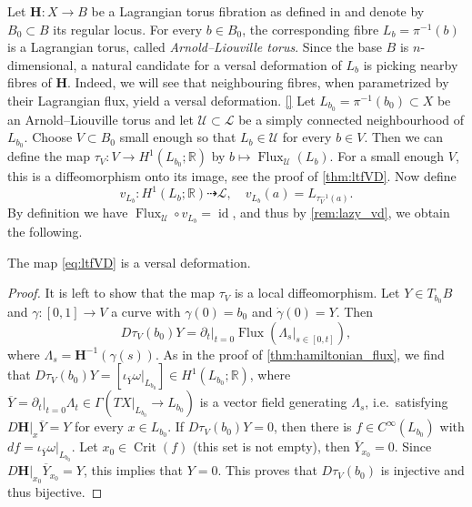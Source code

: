 \documentclass[12pt,a4paper,draft]{scrartcl}
\DeclareMathOperator{\id}{id}
\DeclareMathOperator{\Flux}{Flux}
\DeclareMathOperator{\Crit}{Crit}
\begin{document}
Let $\symbf{H} \colon X \rightarrow B$ be a Lagrangian torus fibration as defined in \cite{evans2021atfs} and denote by $B_0 \subset B$ its regular locus. For every $b \in B_0$, the corresponding fibre $L_b = \pi^{-1}(b)$ is a Lagrangian torus, called \emph{Arnold--Liouville torus}. Since the base $B$ is $n$-dimensional, a natural candidate for a versal deformation of $L_b$ is picking nearby fibres of $\symbf{H}$. Indeed, we will see that neighbouring fibres, when parametrized by their Lagrangian flux, yield a versal deformation. 
\ref{}
Let $L_{b_0} = \pi^{-1}(b_0) \subset X$ be an Arnold--Liouville torus and let $\mathcal{U} \subset \mathcal{L}$ be a simply connected neighbourhood of $L_{b_0}$. Choose $V \subset B_0$ small enough so that $L_b \in \mathcal{U}$ for every $b \in V$. Then we can define the map $τ_V \colon V \rightarrow H^1(L_{b_0};\mathbb{R})$ by $b \mapsto \Flux_{\mathcal{U}}(L_b)$. For a small enough $V$, this is a diffeomorphism onto its image, see the proof of \cref{thm:ltfVD}. Now define
\begin{equation}
    \label{eq:ltfVD}
    v_{L_b} \colon H^1(L_b;\mathbb{R}) \dashrightarrow \mathcal{L}, \quad
    v_{L_b}(a) = L_{τ_V^{-1}(a)}.
\end{equation}
By definition we have $\Flux_{\mathcal{U}} \circ v_{L_b} = \id$, and thus by \cref{rem:lazy_vd}, we obtain the following. 

\begin{proposition}
    \label{thm:ltfVD}
    The map \eqref{eq:ltfVD} is a versal deformation. 
\end{proposition}

\begin{proof}
    It is left to show that the map $τ_V$ is a local diffeomorphism.
    Let $Y \in T_{b_0}B$ and $\gamma \colon [0,1] \rightarrow V$ a curve with $\gamma(0) = b_0$ and $\dot{\gamma}(0) = Y$.
    Then 
    \[
        \label{eq:Dphi}
        Dτ_V(b_0) Y = \partial_t\vert_{t = 0} \Flux (\Lambda_s\vert_{s \in [0,t]}),
    \]
    where $\Lambda_s = \mathbf{H}^{-1}(\gamma(s))$.
    As in the proof of \cref{thm:hamiltonian_flux}, we find that $Dτ_V(b_0) Y = [\iota_{\overline{Y}}\omega \vert_{L_{b_0}}] \in H^1(L_{b_0};\mathbb{R})$, where $\overline{Y} = \partial_t \vert_{t=0} \Lambda_t \in \Gamma(TX\vert_{L_{b_0}} \rightarrow L_{b_0})$ is a vector field generating $\Lambda_s$, i.e.\ satisfying $D\mathbf{H}\vert_x \overline{Y} = Y$ for every $x \in L_{b_0}$.
    If $Dτ_V(b_0) Y = 0$, then there is $f \in C^{\infty}(L_{b_0})$ with $df = \iota_{\overline{Y}}\omega \vert_{L_{b_0}}$.
    Let $x_0 \in \Crit(f)$ (this set is not empty), then $\overline{Y}_{x_0} = 0$.
    Since $D\mathbf{H} \vert_{x_0} \overline{Y}_{x_0} = Y$, this implies that $Y = 0$.
    This proves that $Dτ_V(b_0)$ is injective and thus bijective. 
\end{proof}
\end{document}
